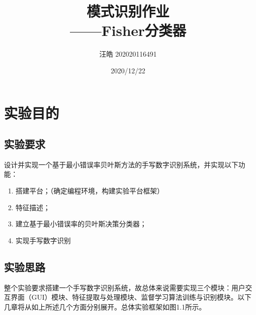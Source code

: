 \documentclass[UTF8, a4paper, 12pt]{report}
\title{模式识别作业\\——Fisher分类器}
\author{汪皓 202020116491}
\date{2020/12/22}
\begin{document}
\maketitle %
\thispagestyle{empty} %
\clearpage %

\pagestyle{plain} %
\setcounter{page}{1} %
\tableofcontents %
\clearpage

\pagestyle{fancy} %
\setcounter{page}{1} %

\chapter{实验目的}
	\section{实验要求}
		设计并实现一个基于最小错误率贝叶斯方法的手写数字识别系统，并实现以下功能：
		\begin{enumerate}[itemindent=1em]
			\renewcommand{\labelenumi}{\theenumi)}
			\item 搭建平台；（确定编程环境，构建实验平台框架）
			\item 特征描述；
			\item 建立基于最小错误率的贝叶斯决策分类器；
			\item 实现手写数字识别
		\end{enumerate}

	\section{实验思路}
		整个实验要求搭建一个手写数字识别系统，故总体来说需要实现三个模块：用户交互界面（GUI）模块、特征提取与处理模块、监督学习算法训练与识别模块。以下几章将从如上所述几个方面分别展开。总体实验框架如图1.1所示。
\end{document}
